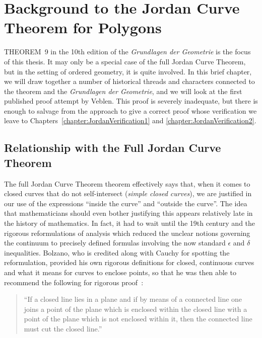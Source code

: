 \chapter{Background to the Jordan Curve Theorem for Polygons}\label{chapter:JordanInformal}
THEOREM~9 in the 10th edition of the \emph{Grundlagen der Geometrie} is the focus of this thesis. It may only be a special case of the full Jordan Curve Theorem, but in the setting of ordered geometry, it is quite involved. In this brief chapter, we will draw together a number of historical threads and characters connected to the theorem and the \emph{Grundlagen der Geometrie}, and we will look at the first published proof attempt by Veblen. This proof is severely inadequate, but there is enough to salvage from the approach to give a correct proof whose verification we leave to Chapters~\ref{chapter:JordanVerification1} and \ref{chapter:JordanVerification2}.

\section{Relationship with the Full Jordan Curve Theorem}\label{sec:JordanCurveHistory}
The full Jordan Curve Theorem theorem effectively says that, when it comes to closed curves that do not self-intersect (\emph{simple closed curves}), we are justified in our use of the expressions ``inside the curve'' and ``outside the curve''. The idea that mathematicians should even bother justifying this appears relatively late in the history of mathematics. In fact, it had to wait until the 19th century and the rigorous reformulations of analysis which reduced the unclear notions governing the continuum to precisely defined formulas involving the now standard $\epsilon$ and $\delta$ inequalities. Bolzano, who is credited along with Cauchy for spotting the reformulation, provided his own rigorous definitions for closed, continuous curves and what it means for curves to enclose points, so that he was then able to recommend the following for rigorous proof~\cite{BolzanoJordan}:

\begin{quote}
``If a closed line lies in a plane and if by means of a connected line one joins a point of the plane which is enclosed within the closed line with a point of the plane which is not enclosed within it, then the connected line must cut the closed line.''
\end{quote}

